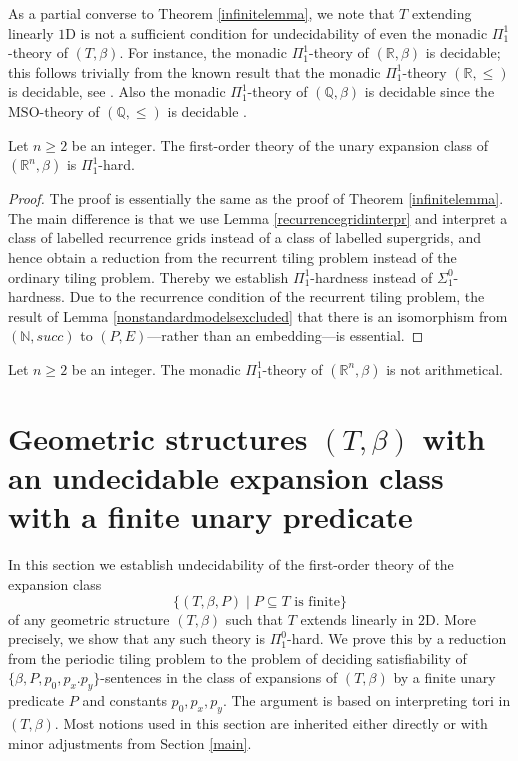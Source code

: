 \documentclass{LMCS}
\theoremstyle{plain}
\newcommand{\rp}{(\mathbb{R}^n,\beta)}
\newcommand{\rsq}{\mathbb{R}^n}
\newcommand{\mi}{\mathit}
\begin{document}
%
%
%
As a partial converse to Theorem \ref{infinitelemma}, we note that $T$ extending
%
linearly $\mathrm{1D}$ 
%
is not a sufficient condition for undecidability of even the
%
monadic $\Pi_1^1$-theory of $(T,\beta)$. 
%
For instance, the monadic $\Pi_1^1$-theory of $(\mathbb{R},\beta)$ is decidable; this follows
%
trivially from the known result that the monadic $\Pi_1^1$-theory $(\mathbb{R},\leq)$ is decidable, see \cite{Burgess}. Also the
%
monadic $\Pi_1^1$-theory of $(\mathbb{Q},\beta)$ is decidable
%
since the $\mathrm{MSO}$-theory of $(\mathbb{Q},\leq)$ is decidable \cite{Rabin:1969}.
%
%
%
\begin{thm}
%
Let $n\geq 2$ be an integer. The first-order theory of the unary expansion class of $\rp$ is $\Pi_1^1$-hard.
%
\end{thm}
%
%
%
\begin{proof}
The proof is essentially the same as the proof of Theorem \ref{infinitelemma}. The main difference is that we use Lemma \ref{recurrencegridinterpr}
%
and interpret a class of labelled recurrence grids instead of a class of labelled supergrids,
%
and hence obtain a reduction from the
%
recurrent tiling problem
%
instead of the ordinary tiling problem. Thereby we establish $\Pi^1_1$-hardness instead of $\Sigma_1^0$-hardness.
%
Due to the recurrence condition of the recurrent tiling problem, the result of Lemma \ref{nonstandardmodelsexcluded} that
%
there is an isomorphism from $(\mathbb{N},\mi{succ})$ to $(P,E)$---rather than an embedding---is essential.
%
\end{proof}
%
\begin{cor}
%
Let $n\geq 2$ be an integer. The monadic $\Pi_1^1$-theory of $(\rsq,\beta)$ is not arithmetical.
%
\end{cor}



\section{Geometric structures $(T,\beta)$ with an undecidable expansion class with a finite
%
unary predicate}\label{section5}
%



%
In this section we establish undecidability of the
%
first-order theory of the expansion class
\[
\{(T,\beta, P)\mid P\subseteq T \text{ is finite}\}
\]
%
of any geometric structure $(T,\beta)$ such that $T$ extends linearly in $\mathrm{2D}$.
%
More precisely, we show that any such theory is $\Pi^0_1$-hard.
%
We prove this by a reduction from the periodic
%
tiling problem to the problem of deciding satisfiability of $\{\beta,P,p_0,p_x.p_y\}$-sentences
%
in the class of expansions of $(T,\beta)$ by a finite unary predicate $P$ and constants $p_0,p_x,p_y$.
%
The argument is based on interpreting tori in $(T,\beta)$.
%
Most notions used in this section are inherited either directly or with minor adjustments from Section \ref{main}.
%
\end{document}
